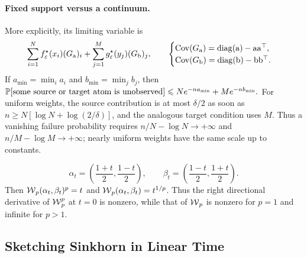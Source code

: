 \paragraph{Fixed support versus a continuum.}
More explicitly, its limiting variable is
\[
\sum_{i=1}^{N}f_\varepsilon^\star(x_i)(G_{\mathrm{a}})_i
+
\sum_{j=1}^{M}g_\varepsilon^\star(y_j)(G_{\mathrm{b}})_j,
\qquad
\begin{cases}
\operatorname{Cov}(G_{\mathrm{a}})=\operatorname{diag}(\mathrm{a})-\mathrm{a}\mathrm{a}^\top,\\
\operatorname{Cov}(G_{\mathrm{b}})=\operatorname{diag}(\mathrm{b})-\mathrm{b}\mathrm{b}^\top.
\end{cases}
\]
If \(a_{\min}=\min_i a_i\) and \(b_{\min}=\min_j b_j\), then
\(\mathbb{P}[\text{some source or target atom is unobserved}] \leqslant N e^{-n a_{\min}}+M e^{-n b_{\min}}.\)
For uniform weights, the source contribution is at most $\delta/2$ as soon as $n\geq N[\log N+\log(2/\delta)]$, and the analogous target condition uses $M$. Thus a vanishing failure probability requires $n/N-\log N\to+\infty$ and $n/M-\log M\to+\infty$; nearly uniform weights have the same scale up to constants.

\[
\alpha_t=\left(\frac{1+t}{2},\frac{1-t}{2}\right),
\qquad
\beta_t=\left(\frac{1-t}{2},\frac{1+t}{2}\right).
\]
Then $\operatorname{\mathcal{W}}_p(\alpha_t,\beta_t)^p=t$ and $\operatorname{\mathcal{W}}_p(\alpha_t,\beta_t)=t^{1/p}$. Thus the right directional derivative of $\operatorname{\mathcal{W}}_p^p$ at $t=0$ is nonzero, while that of $\operatorname{\mathcal{W}}_p$ is nonzero for $p=1$ and infinite for $p>1$.

\subsection{Sketching Sinkhorn in Linear Time}
\label{sec-sketching-sinkhorn}
